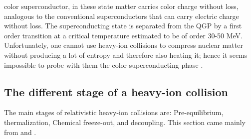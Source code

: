 \documentclass[12pt,a4paper]{book}
\begin{document}
	color superconductor, in these state matter carries color charge without loss, analogous to the conventional superconductors that can carry electric charge without loss. The superconducting state is separated from the QGP by a first order transition at a critical temperature estimated to be of order 30-50 MeV.  Unfortunately, one cannot use heavy-ion collisions to compress nuclear matter without producing a lot of entropy and therefore also heating it; hence it seems impossible to probe with them the color superconducting phase \cite{heinz2004conceptsheavyionphysics}.
	
	\subsection{The different stage of a heavy-ion collision}
	The main stages of relativistic heavy-ion collisions are: Pre-equilibrium, thermalization, Chemical freeze-out, and	decoupling. This section came mainly from \cite{heinz2004conceptsheavyionphysics} and \cite{amsdottorato9036}.
\end{document}
